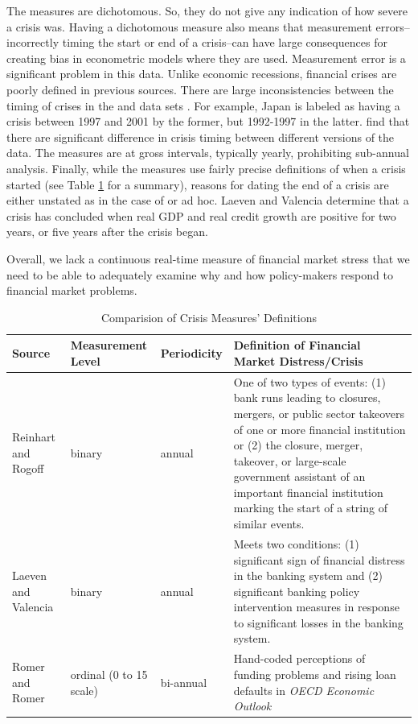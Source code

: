 \documentclass[]{article}
\begin{document}
The measures are dichotomous. So, they do not give any indication of how
severe a crisis was. Having a dichotomous measure also means that measurement errors--incorrectly timing the start or end of a crisis--can have large consequences for creating bias in econometric models where they are used. Measurement error is a significant problem in this data. Unlike economic recessions, financial crises are poorly defined in previous sources. There are large inconsistencies between the timing of crises in the \cite{laeven2013} and \cite{Reinhart2009} data sets \citep{Chaudron2014}. For example, Japan is labeled as having a crisis between 1997 and 2001 by the former, but 1992-1997 in the latter. \cite{GandrudHallerberg2015} find that there are significant difference in crisis timing between different versions of the \cite{laeven2013} data. The measures are at gross intervals, typically yearly, prohibiting sub-annual analysis. Finally, while the measures use fairly precise definitions of when a crisis started (see Table \ref{comp_table} for a summary), reasons for dating the end of a crisis are either unstated as in the case of \cite{Reinhart2009} or ad hoc. Laeven and Valencia \citeyearpar[footnote 19]{laeven2013} determine that a crisis has concluded when real GDP and real credit growth are positive for two years, or five years after the crisis began.

Overall, we lack a continuous real-time measure of financial market stress that we need to be able to adequately examine why and how policy-makers respond to financial market problems.

\begin{table}
    \caption{Comparision of Crisis Measures' Definitions}
    \label{comp_table}
    \begin{center}
        \begin{tabular}{m{3cm} | m{2cm} m{2cm} m{7cm}}
            Source & Measurement Level & Periodicity &  Definition of Financial Market Distress/Crisis \\
            \hline\hline
                Reinhart and Rogoff \citeyearpar[11]{Reinhart2009} & binary & annual & One of two types of events: (1) bank runs leading to closures, mergers, or public sector takeovers of one or more financial institution or (2) the closure, merger, takeover, or large-scale government assistant of an important financial institution marking the start of a string of similar events.  \\
                Laeven and Valencia \citeyearpar[228]{laeven2013} & binary & annual & Meets two conditions: (1) significant sign of financial distress in the banking system and (2) significant banking policy intervention measures in response to significant losses in the banking system.  \\
                Romer and Romer \citeyearpar[3]{Romer2015} & ordinal (0 to 15 scale) & bi-annual & Hand-coded perceptions of funding problems and rising loan defaults in \emph{OECD Economic Outlook}  \\
            \hline
        \end{tabular}
    \end{center}
\end{table}
\end{document}
